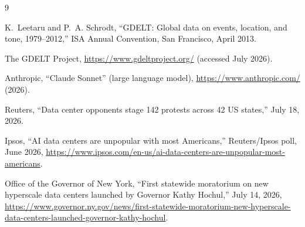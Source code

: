 \documentclass[11pt]{article}
\begin{document}
\begin{thebibliography}{9}

K.~Leetaru and P.~A. Schrodt,
``GDELT: Global data on events, location, and tone, 1979--2012,''
ISA Annual Convention, San Francisco, April 2013.

The GDELT Project, \url{https://www.gdeltproject.org/} (accessed July
2026).

Anthropic, ``Claude Sonnet'' (large language model),
\url{https://www.anthropic.com/} (2026).

Reuters, ``Data center opponents stage 142 protests across 42 US states,''
July 18, 2026.

Ipsos, ``AI data centers are unpopular with most Americans,''
Reuters/Ipsos poll, June 2026,
\url{https://www.ipsos.com/en-us/ai-data-centers-are-unpopular-most-americans}.

Office of the Governor of New York, ``First statewide moratorium on new
hyperscale data centers launched by Governor Kathy Hochul,'' July 14, 2026,
\url{https://www.governor.ny.gov/news/first-statewide-moratorium-new-hyperscale-data-centers-launched-governor-kathy-hochul}.

\end{thebibliography}
\end{document}
